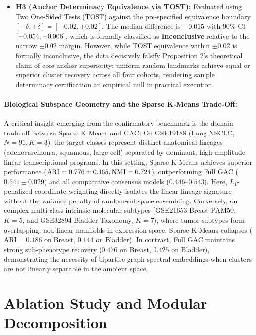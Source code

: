 \documentclass[pdflatex,sn-mathphys-num]{sn-jnl}
\theoremstyle{thmstyleone}
\theoremstyle{thmstyletwo}
\theoremstyle{thmstylethree}
\begin{document}
\begin{itemize}
    \item \textbf{H3 (Anchor Determinacy Equivalence via TOST):} Evaluated using Two One-Sided Tests (TOST) against the pre-specified equivalence boundary $[-\delta, +\delta] = [-0.02, +0.02]$. The median difference is $-0.015$ with $90\%$ CI $[-0.054, +0.006]$, which is formally classified as \textbf{Inconclusive} relative to the narrow $\pm 0.02$ margin. However, while TOST equivalence within $\pm 0.02$ is formally inconclusive, the data decisively falsify Proposition 2's theoretical claim of core anchor superiority: uniform random landmarks achieve equal or superior cluster recovery across all four cohorts, rendering sample determinacy certification an empirical null in practical execution.
\end{itemize}

\paragraph{Biological Subspace Geometry and the Sparse K-Means Trade-Off:}
A critical insight emerging from the confirmatory benchmark is the domain trade-off between Sparse K-Means and GAC:
On GSE19188 (Lung NSCLC, $N=91, K=3$), the target classes represent distinct anatomical lineages (adenocarcinoma, squamous, large cell) separated by dominant, high-amplitude linear transcriptional programs. In this setting, Sparse K-Means achieves superior performance ($\text{ARI} = 0.776 \pm 0.165, \text{NMI} = 0.724$), outperforming Full GAC ($0.541 \pm 0.029$) and all comparative consensus models ($0.446\text{--}0.543$). Here, $L_1$-penalized coordinate weighting directly isolates the linear lineage signature without the variance penalty of random-subspace ensembling.
Conversely, on complex multi-class intrinsic molecular subtypes (GSE21653 Breast PAM50, $K=5$, and GSE32894 Bladder Taxonomy, $K=7$), where tumor subtypes form overlapping, non-linear manifolds in expression space, Sparse K-Means collapses ($\text{ARI} = 0.186$ on Breast, $0.144$ on Bladder). In contrast, Full GAC maintains strong sub-phenotype recovery ($0.476$ on Breast, $0.425$ on Bladder), demonstrating the necessity of bipartite graph spectral embeddings when clusters are not linearly separable in the ambient space.


\clearpage
\section{Ablation Study and Modular Decomposition}\label{sec:ablation}
\end{document}
